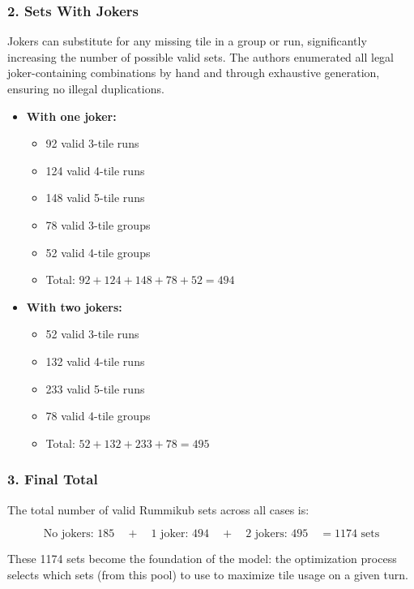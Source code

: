 \documentclass[12pt]{article}
\begin{document}
\subsubsection*{2. Sets With Jokers}

Jokers can substitute for any missing tile in a group or run, significantly increasing the number of possible valid sets. The authors enumerated all legal joker-containing combinations by hand and through exhaustive generation, ensuring no illegal duplications.

\begin{itemize}
    \item \textbf{With one joker:}
    \begin{itemize}
        \item 92 valid 3-tile runs
        \item 124 valid 4-tile runs
        \item 148 valid 5-tile runs
        \item 78 valid 3-tile groups
        \item 52 valid 4-tile groups
        \item Total: $92 + 124 + 148 + 78 + 52 = 494$
    \end{itemize}

    \item \textbf{With two jokers:}
    \begin{itemize}
        \item 52 valid 3-tile runs
        \item 132 valid 4-tile runs
        \item 233 valid 5-tile runs
        \item 78 valid 4-tile groups
        \item Total: $52 + 132 + 233 + 78 = 495$
    \end{itemize}
\end{itemize}

\subsubsection*{3. Final Total}

The total number of valid Rummikub sets across all cases is:

\[
\text{No jokers: } 185 \quad + \quad \text{1 joker: } 494 \quad + \quad \text{2 jokers: } 495 \quad = \boxed{1174 \text{ sets}}
\]

These 1174 sets become the foundation of the model: the optimization process selects which sets (from this pool) to use to maximize tile usage on a given turn.
\end{document}
